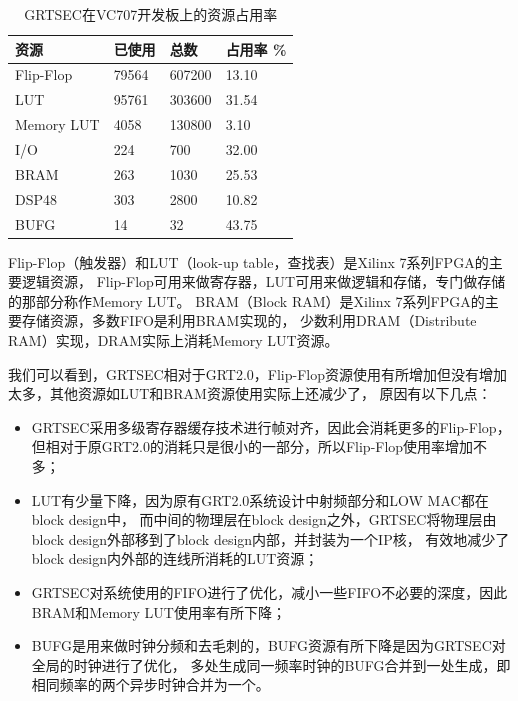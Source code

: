       \begin{table}[!hbp]
      \centering
      \caption{GRTSEC在VC707开发板上的资源占用率}
      \label{tab:envaluate_grtsec_resource}
        \begin{tabular}{|l|l|l|l|} \hline
        资源 & 已使用 & 总数 & 占用率 \% \\ \hline
        Flip-Flop & 79564 & 607200 & 13.10 \\ \hline
        LUT & 95761 & 303600 & 31.54 \\ \hline
        Memory LUT & 4058 & 130800 & 3.10 \\ \hline
        I/O & 224 & 700 & 32.00 \\ \hline
        BRAM & 263 & 1030 & 25.53 \\ \hline
        DSP48 & 303 & 2800 & 10.82 \\ \hline
        BUFG & 14 & 32 & 43.75 \\ \hline
        \end{tabular}
      \end{table}

    Flip-Flop（触发器）和LUT（look-up table，查找表）是Xilinx 7系列FPGA的主要逻辑资源，
    Flip-Flop可用来做寄存器，LUT可用来做逻辑和存储，专门做存储的那部分称作Memory LUT。
    BRAM（Block RAM）是Xilinx 7系列FPGA的主要存储资源，多数FIFO是利用BRAM实现的，
    少数利用DRAM（Distribute RAM）实现，DRAM实际上消耗Memory LUT资源。

    我们可以看到，GRTSEC相对于GRT2.0，Flip-Flop资源使用有所增加但没有增加太多，其他资源如LUT和BRAM资源使用实际上还减少了，
    原因有以下几点：
    	\begin{itemize}
    		\item GRTSEC采用多级寄存器缓存技术进行帧对齐，因此会消耗更多的Flip-Flop，
        但相对于原GRT2.0的消耗只是很小的一部分，所以Flip-Flop使用率增加不多；
    		\item LUT有少量下降，因为原有GRT2.0系统设计中射频部分和LOW MAC都在block design中，
        而中间的物理层在block design之外，GRTSEC将物理层由block design外部移到了block design内部，并封装为一个IP核，
        有效地减少了block design内外部的连线所消耗的LUT资源；
    		\item GRTSEC对系统使用的FIFO进行了优化，减小一些FIFO不必要的深度，因此BRAM和Memory LUT使用率有所下降；
        \item BUFG是用来做时钟分频和去毛刺的，BUFG资源有所下降是因为GRTSEC对全局的时钟进行了优化，
        多处生成同一频率时钟的BUFG合并到一处生成，即相同频率的两个异步时钟合并为一个。
    	\end{itemize}

